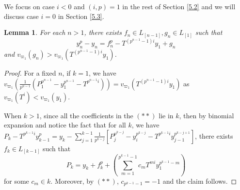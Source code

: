 \documentclass{proc-l}
\newtheorem{lemma}[theorem]{Lemma}
\theoremstyle{definition}
\theoremstyle{remark}
\numberwithin{equation}{section}
\begin{document}
We focus on case $i<0$ and $(i,p)=1$ in the rest of Section \ref{5.2} and we will discuss case $i=0$ in Section \ref{5.3}.

\begin{lemma}\label{4.8}
    For each $n>1$, there exists $f_n\in L_{[n-1]},g_n\in L_{[1]}$ such that $$y_n^p-y_n=f_n^p-T^{(p^{n-1}-1)i}y_1+g_n$$ and $v_{\varpi_1}(g_n)>v_{\varpi_1}(T^{(p^{n-1}-1)i}y_1)$.
\end{lemma}
\begin{proof}
    For a fixed $n$, if $k=1$, we have $v_{\varpi_1}(\frac{1}{p^{n-1}}(P_1^{p^{n-1}}-y_1^{p^{n-1}}-T^{p^{n-1}i}))=v_{\varpi_1}(T^{(p^{n-1}-1)i}y_1)$ as $v_{\varpi_1}(T^i)<v_{\varpi_1}(y_1)$.
    
    When $k>1$, since all the coefficients in the $(**)$ lie in $k$, then by binomial expansion and notice the fact that for all $k$, we have $P_k-T^{p^{k-1}i}y_{k-1}^p=y_k-\sum_{j=1}^{k-1}\frac{1}{p^{k-j}}[P_j^{p^{k-j}}-y_i^{p^{k-j}}-T^{p^{k-1}i}y_{j-1}^{p^{k-j+1}}]$, there exists $f_k\in L_{[k-1]}$ such that $$P_k=y_k+f_k^p+(\sum_{m=1}^{p^{k-1}-1}c_mT^{mi}y_1^{p^{k-1}-m})$$
    for some $c_m\in k$. Moreover, by $(**)$, $c_{p^{k-1}-1}=-1$ and the claim follows.
\end{proof}
\end{document}
